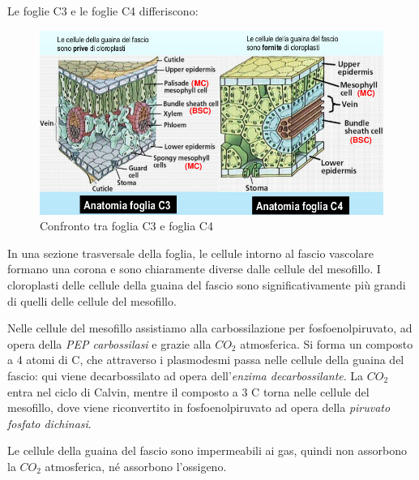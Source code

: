 \documentclass[a4paper,12pt]{book}
\begin{document}
Le foglie C3 e le foglie C4 differiscono:
\begin{figure}[H]
\centering
\includegraphics[scale=.4]{immagini/C4.jpg}
\caption{Confronto tra foglia C3 e foglia C4}
\end{figure} 
In una sezione trasversale della
foglia, le cellule intorno al fascio vascolare
formano una corona e sono chiaramente
diverse dalle cellule del mesofillo. I
cloroplasti delle cellule della guaina del
fascio sono significativamente più grandi di
quelli delle cellule del mesofillo.

Nelle cellule del mesofillo assistiamo alla carbossilazione per fosfoenolpiruvato, ad opera della \emph{PEP carbossilasi} e grazie alla $CO_{2}$ atmosferica. Si forma un composto a 4 atomi di C, che attraverso i plasmodesmi passa nelle cellule della guaina del fascio: qui viene decarbossilato ad opera dell'\emph{enzima decarbossilante}. La $CO_{2}$ entra nel ciclo di Calvin, mentre il composto a 3 C torna nelle cellule del mesofillo, dove viene riconvertito in fosfoenolpiruvato ad opera della \emph{piruvato fosfato dichinasi}.

Le cellule della guaina del fascio sono impermeabili ai gas, quindi non assorbono la $CO_{2}$ atmosferica, né assorbono l'ossigeno.
\end{document}

